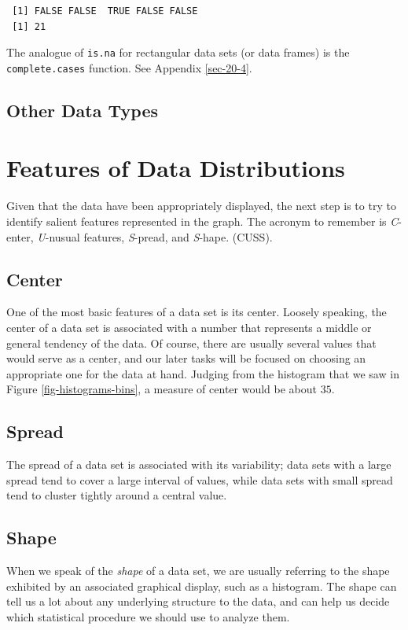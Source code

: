 \documentclass[captions=tableheading]{scrbook}
\begin{document}
\begin{verbatim}
 [1] FALSE FALSE  TRUE FALSE FALSE
 [1] 21
\end{verbatim}

The analogue of \texttt{is.na} for rectangular data sets (or data frames) is the \texttt{complete.cases} function. See Appendix \ref{sec-20-4}.
\subsection{Other Data Types}
\label{sec-3-1-7}
\label{sub-other-data-types}
\section{Features of Data Distributions}
\label{sec-3-2}
\label{sec-features-of-data}


Given that the data have been appropriately displayed, the next step is to try to identify salient features represented in the graph. The acronym to remember is \emph{C}-enter, \emph{U}-nusual features, \emph{S}-pread, and \emph{S}-hape. (CUSS).
\subsection{Center}
\label{sec-3-2-1}
\label{sub-Center}


One of the most basic features of a data set is its center. Loosely speaking, the center of a data set is associated with a number that represents a middle or general tendency of the data. Of course, there are usually several values that would serve as a center, and our later tasks will be focused on choosing an appropriate one for the data at hand. Judging from the histogram that we saw in Figure \ref{fig-histograms-bins}, a measure of center would be about \(  35 \). 
\subsection{Spread}
\label{sec-3-2-2}
\label{sub-Spread}


The spread of a data set is associated with its variability; data sets with a large spread tend to cover a large interval of values, while data sets with small spread tend to cluster tightly around a central value. 
\subsection{Shape}
\label{sec-3-2-3}
\label{sub-Shape}


When we speak of the \emph{shape} of a data set, we are usually referring to the shape exhibited by an associated graphical display, such as a histogram. The shape can tell us a lot about any underlying structure to the data, and can help us decide which statistical procedure we should use to analyze them.
\end{document}

